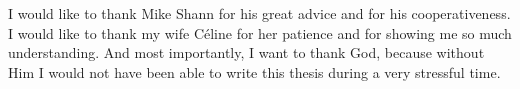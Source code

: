 \begin{acknowledgements}
I would like to thank Mike Shann for his great advice and for his cooperativeness. I would like to thank my wife C\'{e}line for her patience and for showing me so much understanding. And most importantly, I want to thank God, because without Him I would not have been able to write this thesis during a very stressful time.
\end{acknowledgements}
